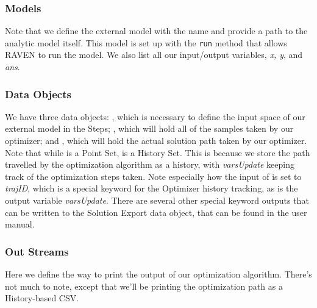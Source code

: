 \subsubsection{Models}
Note that we define the external model with the name  and provide a path to the analytic
model itself.  This model is set up with the \texttt{run} method that allows RAVEN to run the model.  We also
list all our input/output variables, \emph{x, y}, and \emph{ans}.

\subsubsection{Data Objects}
We have three data objects: , which is necessary to define the input space of our external
model in the Steps; , which will hold all of the samples taken by our optimizer; and
, which will hold the actual solution path taken by our optimizer.  Note that while
 is a Point Set,  is a History Set.  This is because we store the
path travelled by the optimization algorithm as a history, with \emph{varsUpdate} keeping track of the
optimization steps taken.  Note especially how the input of  is set to \emph{trajID},
which is a special keyword for the Optimizer history tracking, as is the output variable \emph{varsUpdate}.
There are several other special keyword outputs that can be written to the Solution Export data object, that
can be found in the user manual.

\subsubsection{Out Streams}
Here we define the way to print the output of our optimization algorithm.  There's not much to note, except
that we'll be printing the optimization path as a History-based CSV.

